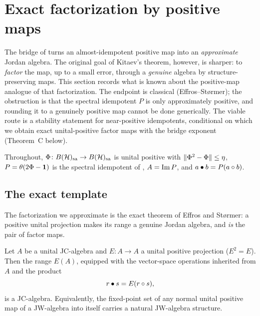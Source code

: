 \section{Exact factorization by positive maps}\label{sec:factorization}

The bridge of  turns an almost-idempotent positive map into an
\emph{approximate} Jordan algebra. The original goal of Kitaev's theorem,
however, is sharper: to \emph{factor} the map, up to a small error, through a
\emph{genuine} algebra by structure-preserving maps. This section records what is
known about the positive-map analogue of that factorization. The endpoint is
classical (Effros--St\o rmer); the obstruction is that the spectral idempotent
$P$ is only approximately positive, and rounding it to a genuinely positive map
cannot be done generically. The viable route is a stability statement for
near-positive idempotents, conditional on which we obtain exact unital-positive
factor maps with the bridge exponent (Theorem~C below).

Throughout, $\Phi\colon B(\mathcal{H})_{\mathrm{sa}}\to B(\mathcal{H})_{\mathrm{sa}}$ is unital positive with
$\lVert \Phi^2-\Phi \rVert\le\eta$, $P=\theta(2\Phi-\mathbf{1})$ is the spectral
idempotent of , $A=\operatorname{Im} P$, and $a\bullet b=P(a\circ b)$.

\subsection{The exact template}

The factorization we approximate is the exact theorem of Effros and
St\o rmer: a positive unital projection makes its range a genuine Jordan
algebra, and \emph{is} the pair of factor maps.

\begin{theorem}\label{thm:effros-stormer}
Let $A$ be a unital JC-algebra and $E\colon A\to A$ a unital positive
projection ($E^2=E$). Then the range $E(A)$, equipped with the vector-space
operations inherited from $A$ and the product
\[
  r\bullet s=E(r\circ s),
\]
is a JC-algebra. Equivalently, the fixed-point set of any normal unital positive
map of a JW-algebra into itself carries a natural JW-algebra structure.
\end{theorem}

